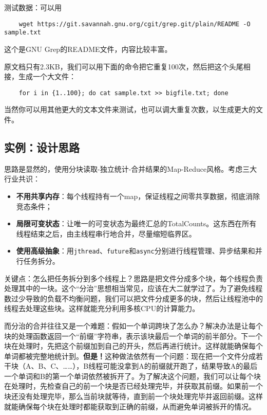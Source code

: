 测试数据：可以用
\begin{lstlisting}
    wget https://git.savannah.gnu.org/cgit/grep.git/plain/README -O sample.txt
\end{lstlisting}
这个是GNU Grep的README文件，内容比较丰富。

原文档只有2.3KB，我们可以用下面的命令把它重复100次，然后把这个头尾相接，生成一个大文件：
\begin{lstlisting}
    for i in {1..100}; do cat sample.txt >> bigfile.txt; done
\end{lstlisting}
当然你可以用其他更大的文本文件来测试，也可以调大重复次数，以生成更大的文件。

\subsection{实例：设计思路}

思路是显然的，使用分块读取-独立统计-合并结果的Map-Reduce风格。考虑三大行业共识：
\begin{itemize}
    \item \textbf{不用共享内存}：每个线程持有一个map，保证线程之间零共享数据，彻底消除竞态条件；
    \item \textbf{局限可变状态}：让唯一的可变状态为最终汇总的TotalCounts。这东西在所有线程结束之后，由主线程串行地合并，尽量缩短临界区。
    \item \textbf{使用高级抽象}：用\texttt{jthread}、\texttt{future}和\texttt{async}分别进行线程管理、异步结果和并行任务拆分。
\end{itemize}

关键点：怎么把任务拆分到多个线程上？思路是把文件分成多个块，每个线程负责处理其中的一块。这个“分治”思想相当常见，应该在大二就学过了。为了避免线程数过少导致的负载不均衡问题，我们可以把文件分成更多的块，然后让线程池中的线程去处理这些块。这样就能充分利用多核CPU的计算能力。

而分治的合并往往又是一个难题：假如一个单词跨块了怎么办？解决办法是让每个块的处理函数返回一个“前缀”字符串，表示该块最后一个单词的前半部分。下一个块在处理时，先把这个前缀加到自己的开头，然后再进行统计。这样就能确保每个单词都被完整地统计到。\textbf{但是！}这种做法依然有一个问题：现在把一个文件分成若干块（A、B、C、……），B线程可能没拿到A的前缀就开跑了，结果导致A的最后一个单词和B的第一个单词依然被拆开了。为了解决这个问题，我们可以让每个块在处理时，先检查自己的前一个块是否已经处理完毕，并获取其前缀。如果前一个块还没有处理完毕，那么当前块就等待，直到前一个块处理完毕并返回前缀。这样就能确保每个块在处理时都能获取到正确的前缀，从而避免单词被拆开的情况。

